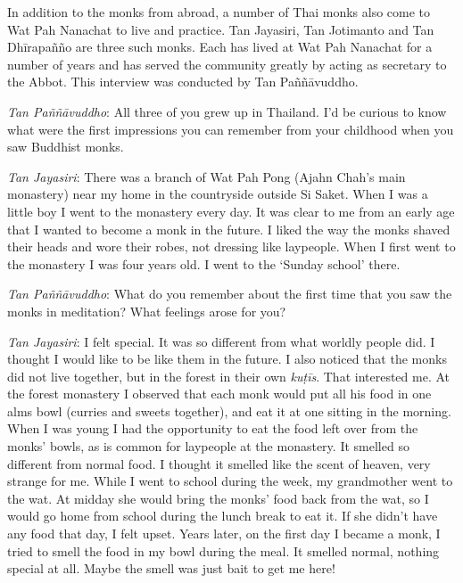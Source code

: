 
\label{no-thai-no-farang}

In addition to the monks from abroad, a number of Thai monks also
come to Wat Pah Nanachat to live and practice. Tan Jayasiri, Tan
Jotimanto and Tan Dhīrapañño are three such monks. Each has lived at Wat
Pah Nanachat for a number of years and has served the community greatly
by acting as secretary to the Abbot. This interview was conducted by Tan
Paññāvuddho.

\emph{Tan Paññāvuddho}: All three of you grew up in Thailand. I'd be
curious to know what were the first impressions you can remember from
your childhood when you saw Buddhist monks. 

\emph{Tan Jayasiri}: There was a branch of Wat Pah Pong (Ajahn Chah's
main monastery) near my home in the countryside outside Si Saket. When I
was a little boy I went to the monastery every day. It was clear to me
from an early age that I wanted to become a monk in the future. I liked
the way the monks shaved their heads and wore their robes, not dressing
like laypeople. When I first went to the monastery I was four years old. 
I went to the `Sunday school' there. 

\emph{Tan Paññāvuddho}: What do you remember about the first time that
you saw the monks in meditation? What feelings arose for you? 

\emph{Tan Jayasiri}: I felt special. It was so different from what
worldly people did. I thought I would like to be like them in the
future. I also noticed that the monks did not live together, but in the
forest in their own \emph{kuṭīs}. That interested me. At the forest
monastery I observed that each monk would put all his food in one alms
bowl (curries and sweets together), and eat it at one sitting in the
morning. When I was young I had the opportunity to eat the food left
over from the monks' bowls, as is common for laypeople at the monastery. 
It smelled so different from normal food. I thought it smelled like the
scent of heaven, very strange for me. While I went to school during the
week, my grandmother went to the wat. At midday she would bring the
monks' food back from the wat, so I would go home from school during the
lunch break to eat it. If she didn't have any food that day, I felt
upset. Years later, on the first day I became a monk, I tried to smell
the food in my bowl during the meal. It smelled normal, nothing special
at all. Maybe the smell was just bait to get me here! 

